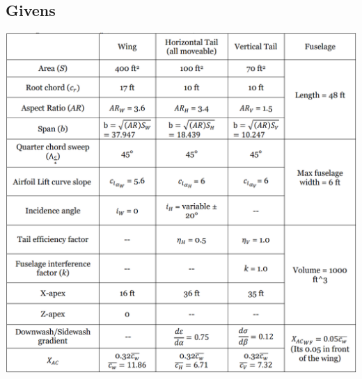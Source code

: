 \documentclass[a4paper, twoside]{article}
\begin{document}
\subsection*{Givens}
\includegraphics[width=\linewidth]{Givens-table.png}
\pagebreak
\end{document}
